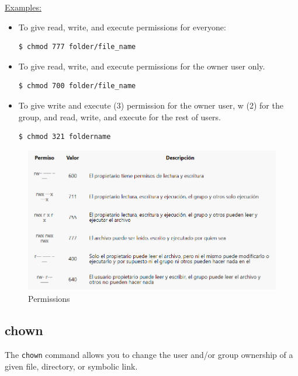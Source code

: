 \documentclass{article}
\newenvironment{codetemplate}[1][]{%
  \mybasecolorbox[#1]
  \itshape
}{%
  \endmybasecolorbox
}
\begin{document}
\underline{Examples:}

\begin{itemize}
    \item To give read, write, and execute permissions for everyone:
\begin{codetemplate}{}
\begin{verbatim}
$ chmod 777 folder/file_name
\end{verbatim}
\end{codetemplate}

    \item To give read, write, and execute permissions for the owner user only.
\begin{codetemplate}{}
\begin{verbatim}
$ chmod 700 folder/file_name
\end{verbatim}
\end{codetemplate}

    \item To give write and execute (3) permission for the owner user, w (2) for the group, and read, write, and execute for the rest of users.
\begin{codetemplate}{}
\begin{verbatim}
$ chmod 321 foldername
\end{verbatim}
\end{codetemplate}
\end{itemize}

\begin{figure}[H]
    \centering
    \includegraphics[scale=0.55]{pictures/chmod.PNG}
    \caption{Permissions}
    \label{chmod}
\end{figure}

\subsection{chown}
The \verb|chown| command allows you to change the user and/or group ownership of a given file, directory, or symbolic link.
\end{document}
